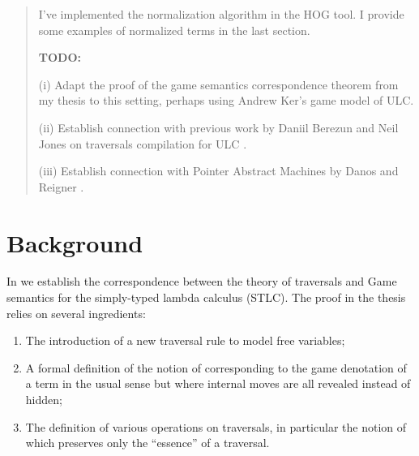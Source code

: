 \documentclass{article}
\theoremstyle{definition}
\begin{document}
\begin{abstract}
I've implemented the normalization algorithm in the HOG tool. I provide some examples of normalized terms in the last section.

{\bf TODO:}

(i) Adapt the proof of the game semantics correspondence theorem from my thesis to this setting, perhaps using Andrew Ker's game model of ULC.

(ii) Establish connection with previous work by Daniil Berezun and Neil Jones on traversals compilation for ULC \cite{JonesBerezunLLL}.

(iii) Establish connection with Pointer Abstract Machines by Danos and Reigner \cite{KerThesis}.
\end{abstract}

\section{Background}

In \cite{BlumPhd} we establish the correspondence between the theory of traversals and Game semantics for the simply-typed lambda calculus (STLC). The proof in the thesis relies on several ingredients:
\begin{enumerate}
  \item The introduction of a new traversal rule  to model free variables;
  \item A formal definition of the notion of  corresponding to the game denotation of a term in the usual sense but where internal moves are all revealed instead of hidden;
  \item The definition of various operations on traversals, in particular the notion of  which preserves only the ``essence'' of a traversal.
\end{enumerate}
\end{document}
